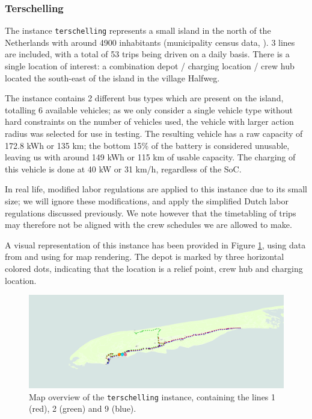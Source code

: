 \documentclass[]{article}
\begin{document}
\subsubsection{Terschelling}
The instance \texttt{terschelling} represents a small island in the north of the Netherlands with around 4900 inhabitants (municipality census data, \citet{Terschelling2025}). 3 lines are included, with a total of 53 trips being driven on a daily basis. There is a single location of interest: a combination depot / charging location / crew hub located the south-east of the island in the village Halfweg. 

The instance contains 2 different bus types which are present on the island, totalling 6 available vehicles; as we only consider a single vehicle type without hard constraints on the number of vehicles used, the vehicle with larger action radius was selected for use in testing. The resulting vehicle has a raw capacity of 172.8 kWh or 135 km; the bottom 15\% of the battery is considered unusable, leaving us with around 149 kWh or 115 km of usable capacity. The charging of this vehicle is done at 40 kW or 31 km/h, regardless of the SoC.

In real life, modified labor regulations are applied to this instance due to its small size; we will ignore these modifications, and apply the simplified Dutch labor regulations discussed previously. We note however that the timetabling of trips may therefore not be aligned with the crew schedules we are allowed to make.

A visual representation of this instance has been provided in Figure \ref{fig:terschelling-map}, using data from \citet{OpenStreetMap2025} and using \citet{QGIS2025} for map rendering. The depot is marked by three horizontal colored dots, indicating that the location is a relief point, crew hub and charging location. 

\begin{figure}[h]
  \centering
  \includegraphics[width=\textwidth]{images/terschelling-instance.png}
  \caption{Map overview of the \texttt{terschelling} instance, containing the lines 1 (red), 2 (green) and 9 (blue).}
  \label{fig:terschelling-map}
\end{figure}
\end{document}
